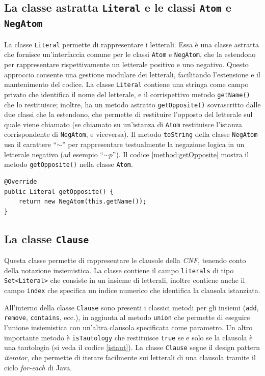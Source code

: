 \documentclass[a4paper,12pt]{report}
\begin{document}
\subsection{La classe astratta \texttt{Literal} e le classi \texttt{Atom} e \texttt{NegAtom}}
\label{literal}
La classe \texttt{Literal} permette di rappresentare i letterali. Essa è una classe astratta che fornisce un'interfaccia comune per le classi \texttt{Atom} e \texttt{NegAtom}, che la estendono per rappresentare rispettivamente un letterale positivo e uno negativo. Questo approccio consente una gestione modulare dei letterali, facilitando l'estensione e il mantenimento del codice. La classe \texttt{Literal} contiene una stringa come campo privato che identifica il nome del letterale, e il corrispettivo metodo \texttt{getName()} che lo restituisce; inoltre, ha un metodo astratto \texttt{getOpposite()} sovrascritto dalle due classi che la estendono, che permette di restituire l'opposto del letterale sul quale viene chiamato (se chiamato su un'istanza di \texttt{Atom} restituisce l'istanza corrispondente di \texttt{NegAtom}, e viceversa). Il metodo \texttt{toString} della classe \texttt{NegAtom} usa il carattere ``\textbf{$\sim $}'' per rappresentare testualmente la negazione logica in un letterale negativo (ad esempio ``$\sim\!p$''). Il codice \ref{method:getOpposite} mostra il metodo \texttt{getOpposite()} nella classe \texttt{Atom}.

\begin{minipage}{\linewidth}
\begin{lstlisting}[caption={metodo astratto \texttt{getOpposite()} sovrascritto dalla classe \texttt{Atom}}, label={method:getOpposite}]
@Override
public Literal getOpposite() {
    return new NegAtom(this.getName());
}
\end{lstlisting}
\end{minipage}

\subsection{La classe \texttt{Clause}}
\label{Clause}
Questa classe permette di rappresentare le clausole della \emph{CNF}, tenendo conto della notazione insiemistica. La classe contiene il campo \texttt{literals} di tipo \texttt{Set<Literal>} che consiste in un insieme di letterali, inoltre contiene anche il campo \texttt{index} che specifica un indice numerico che identifica la clausola istanziata.

All'interno della classe \texttt{Clause} sono presenti i classici metodi per gli insiemi (\texttt{add}, \texttt{remove}, \texttt{contains}, ecc.), in aggiunta al metodo \texttt{union} che permette di eseguire l'unione insiemistica con un'altra clausola specificata come parametro. Un altro importante metodo è \texttt{isTautology} che restituisce \texttt{true} se e solo se la clausola è una tautologia (si veda il codice \ref{istaut}). La classe \texttt{Clause} segue il design pattern \emph{iterator}, che permette di iterare facilmente sui letterali di una clausola tramite il ciclo \emph{for-each} di Java.
\end{document}

